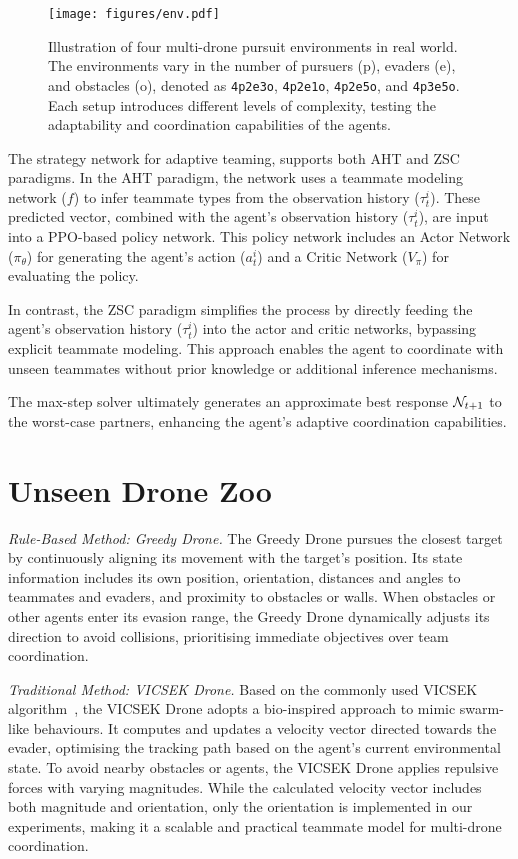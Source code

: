 \begin{figure}
    \centering
    \texttt{[image: figures/env.pdf]}
    \caption{Illustration of four multi-drone pursuit environments in real world. The environments vary in the number of pursuers (p), evaders (e), and obstacles (o), denoted as \texttt{4p2e3o}, \texttt{4p2e1o}, \texttt{4p2e5o}, and \texttt{4p3e5o}. 
    Each setup introduces different levels of complexity, testing the adaptability and coordination capabilities of the agents.}
    \label{fig:app_env}
\end{figure}

The strategy network for adaptive teaming, supports both AHT and ZSC paradigms. In the AHT paradigm, the network uses a teammate modeling network (\(f\)) to infer teammate types from the observation history (\(\tau_t^{i}\)). These predicted vector, combined with the agent’s observation history (\(\tau_t^i\)), are input into a PPO-based policy network. This policy network includes an Actor Network (\(\pi_\theta\)) for generating the agent’s action (\(a_t^i\)) and a Critic Network (\(V_\pi\)) for evaluating the policy.

In contrast, the ZSC paradigm simplifies the process by directly feeding the agent’s observation history (\(\tau_t^i\)) into the actor and critic networks, bypassing explicit teammate modeling. This approach enables the agent to coordinate with unseen teammates without prior knowledge or additional inference mechanisms.

The max-step solver ultimately generates an approximate best response ${\mathcal{N}}_{t+1}$ to the worst-case partners, enhancing the agent’s adaptive coordination capabilities.

\section{Unseen Drone Zoo}
\label{appendix:unseen_zoo}
\textit{Rule-Based Method: Greedy Drone. }  
The Greedy Drone pursues the closest target by continuously aligning its movement with the target’s position. Its state information includes its own position, orientation, distances and angles to teammates and evaders, and proximity to obstacles or walls. When obstacles or other agents enter its evasion range, the Greedy Drone dynamically adjusts its direction to avoid collisions, prioritising immediate objectives over team coordination.

\textit{Traditional Method: VICSEK Drone. }  
Based on the commonly used VICSEK algorithm~\cite{Janosov2017Group,ZhangDACOOP2023,hola-drone}, the VICSEK Drone adopts a bio-inspired approach to mimic swarm-like behaviours. It computes and updates a velocity vector directed towards the evader, optimising the tracking path based on the agent’s current environmental state. To avoid nearby obstacles or agents, the VICSEK Drone applies repulsive forces with varying magnitudes. While the calculated velocity vector includes both magnitude and orientation, only the orientation is implemented in our experiments, making it a scalable and practical teammate model for multi-drone coordination.

